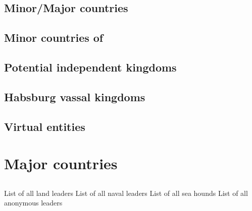



\section{Minor/Major countries}





\section{Minor countries of \ROTW}





\section{Potential independent kingdoms}





\section{Habsburg vassal kingdoms}\label{ch10:Habsburg vassal kingdoms}





\section{Virtual entities}


\chapter{Major countries}




\section{\paysmajeurAngleterre}

\aparag List of all land leaders 
\aparag List of all naval leaders 
\aparag List of all sea hounds 
\aparag List of all anonymous leaders \listanonymeangleterre





